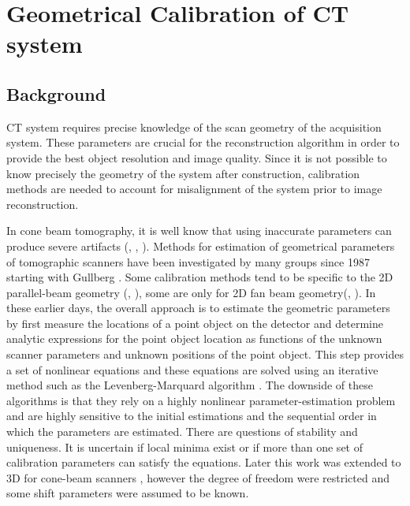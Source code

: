 \chapter{Geometrical Calibration of CT system}
\label{chap:calibration}

\section{Background}
CT system requires precise knowledge of the scan geometry of the acquisition system.  These parameters are crucial for the reconstruction algorithm in order to provide the best object resolution and image quality.  Since it is not possible to know precisely the geometry of the system after construction, calibration methods are needed to account for misalignment of the system prior to image reconstruction.  

In cone beam tomography, it is well know that using inaccurate parameters can produce severe artifacts (\citep{Li1994a}, \citep{Li1994b}, \citep{Wang1998}). Methods for estimation of geometrical parameters of tomographic scanners have been investigated by many groups since 1987 starting with Gullberg \citep{Gullberg1987}.  Some calibration methods tend to be specific to the 2D parallel-beam geometry (\citep{Azevedo1990}, \citep{Busemann1987}), some are only for 2D fan beam geometry(\citep{Crawford1988}, \citep{Hsieh1999} \citep{Gullberg1987}).  In these earlier days, the overall approach is to estimate the geometric parameters by first measure the locations of a point object on the detector and determine analytic expressions for the point object location as functions of the unknown scanner parameters and unknown positions of the point object.  This step provides a set of nonlinear equations and these equations are solved using an iterative method such as the Levenberg-Marquard algorithm \cite{Rougee1993}.  The downside of these algorithms is that they rely on a highly nonlinear parameter-estimation problem and are highly sensitive to the initial estimations and the sequential order in which the parameters are estimated.  There are questions of stability and uniqueness.  It is uncertain if local minima exist or if more than one set of calibration parameters can satisfy the equations.  Later this work was extended to 3D for cone-beam scanners \citep{Gullberg1990}, however the degree of freedom were restricted and some shift parameters were assumed to be known.


